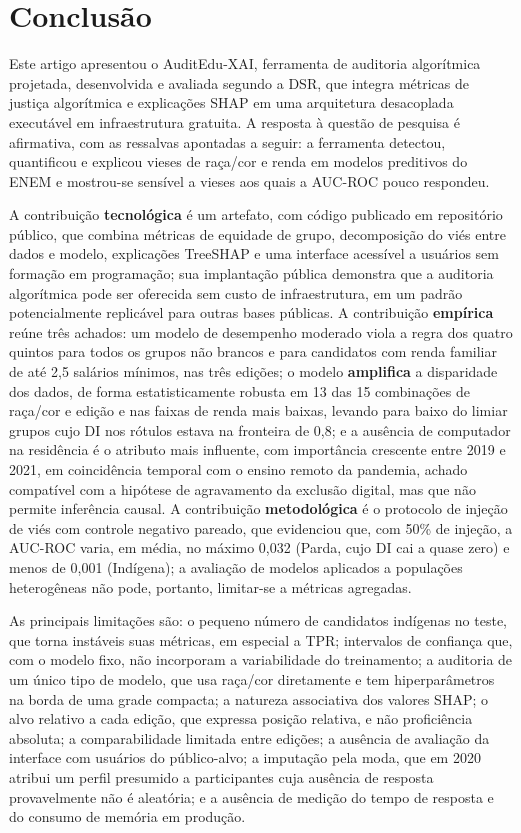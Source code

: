 \section{Conclusão}
\label{sec:conclusao}

Este artigo apresentou o AuditEdu-XAI, ferramenta de auditoria algorítmica projetada, desenvolvida e avaliada segundo a DSR, que integra métricas de justiça algorítmica e explicações SHAP em uma arquitetura desacoplada executável em infraestrutura gratuita. A resposta à questão de pesquisa é afirmativa, com as ressalvas apontadas a seguir: a ferramenta detectou, quantificou e explicou vieses de raça/cor e renda em modelos preditivos do ENEM e mostrou-se sensível a vieses aos quais a AUC-ROC pouco respondeu.

A contribuição \textbf{tecnológica} é um artefato, com código publicado em repositório público, que combina métricas de equidade de grupo, decomposição do viés entre dados e modelo, explicações TreeSHAP e uma interface acessível a usuários sem formação em programação; sua implantação pública demonstra que a auditoria algorítmica pode ser oferecida sem custo de infraestrutura, em um padrão potencialmente replicável para outras bases públicas. A contribuição \textbf{empírica} reúne três achados: um modelo de desempenho moderado viola a regra dos quatro quintos para todos os grupos não brancos e para candidatos com renda familiar de até 2,5 salários mínimos, nas três edições; o modelo \textbf{amplifica} a disparidade dos dados, de forma estatisticamente robusta em 13 das 15 combinações de raça/cor e edição e nas faixas de renda mais baixas, levando para baixo do limiar grupos cujo DI nos rótulos estava na fronteira de 0,8; e a ausência de computador na residência é o atributo mais influente, com importância crescente entre 2019 e 2021, em coincidência temporal com o ensino remoto da pandemia, achado compatível com a hipótese de agravamento da exclusão digital, mas que não permite inferência causal. A contribuição \textbf{metodológica} é o protocolo de injeção de viés com controle negativo pareado, que evidenciou que, com 50\% de injeção, a AUC-ROC varia, em média, no máximo 0,032 (Parda, cujo DI cai a quase zero) e menos de 0,001 (Indígena); a avaliação de modelos aplicados a populações heterogêneas não pode, portanto, limitar-se a métricas agregadas.

As principais limitações são: o pequeno número de candidatos indígenas no teste, que torna instáveis suas métricas, em especial a TPR; intervalos de confiança que, com o modelo fixo, não incorporam a variabilidade do treinamento; a auditoria de um único tipo de modelo, que usa raça/cor diretamente e tem hiperparâmetros na borda de uma grade compacta; a natureza associativa dos valores SHAP; o alvo relativo a cada edição, que expressa posição relativa, e não proficiência absoluta; a comparabilidade limitada entre edições; a ausência de avaliação da interface com usuários do público-alvo; a imputação pela moda, que em 2020 atribui um perfil presumido a participantes cuja ausência de resposta provavelmente não é aleatória; e a ausência de medição do tempo de resposta e do consumo de memória em produção.

